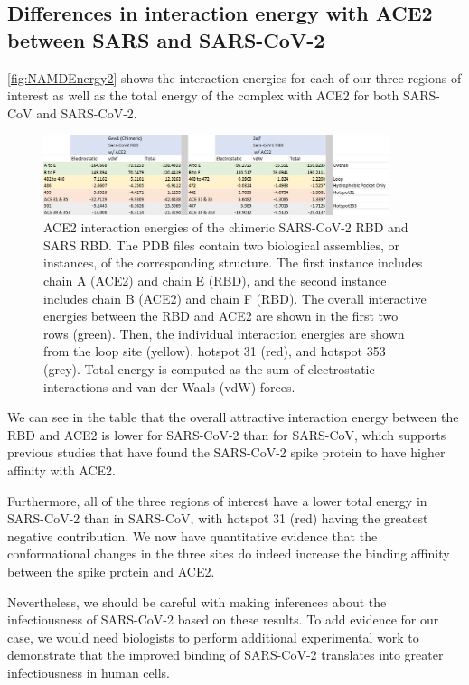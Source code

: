 \FloatBarrier
{}
\subsection{Differences in interaction energy with ACE2 between SARS and SARS-CoV-2}

\autoref{fig:NAMDEnergy2} shows the interaction energies for each of our three regions of interest as well as the total energy of the complex with ACE2 for both SARS-CoV and SARS-CoV-2.

\begin{figure}[h]
	\centering
	\mySfFamily
	\includegraphics[width = 0.9\textwidth]{../images/NAMDEnergy2.png}
	\caption{ACE2 interaction energies of the chimeric SARS-CoV-2 RBD and SARS RBD. The PDB files contain two biological assemblies, or instances, of the corresponding structure. The first instance includes chain A (ACE2) and chain E (RBD), and the second instance includes chain B (ACE2) and chain F (RBD). The overall interactive energies between the RBD and ACE2 are shown in the first two rows (green). Then, the individual interaction energies are shown from the loop site (yellow), hotspot 31 (red), and hotspot 353 (grey). Total energy is computed as the sum of electrostatic interactions and van der Waals (vdW) forces.}
	\label{fig:NAMDEnergy2}
\end{figure}

We can see in the table that the overall attractive interaction energy between the RBD and ACE2 is lower for SARS-CoV-2 than for SARS-CoV, which supports previous studies that have found the SARS-CoV-2 spike protein to have higher affinity with ACE2.

Furthermore, all of the three regions of interest have a lower total energy in SARS-CoV-2 than in SARS-CoV, with hotspot 31 (red) having the greatest negative contribution. We now have quantitative evidence that the conformational changes in the three sites do indeed increase the binding affinity between the spike protein and ACE2.

Nevertheless, we should be careful with making inferences about the infectiousness of SARS-CoV-2 based on these results. To add evidence for our case, we would need biologists to perform additional experimental work to demonstrate that the improved binding of SARS-CoV-2 translates into greater infectiousness in human cells.

